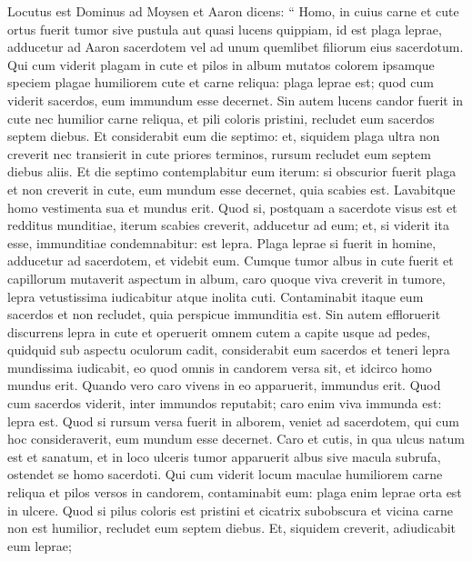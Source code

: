 \begin{biblechapter}
\begin{biblechapter}
\begin{biblechapter}
\begin{biblechapter}
\begin{biblechapter}
\begin{biblechapter}
\begin{biblechapter}
\begin{biblechapter}
\begin{biblechapter}
\begin{biblechapter}
\begin{biblechapter}
\begin{biblechapter}
\begin{biblechapter}
\verse Locutus est Dominus ad Moysen et Aaron dicens: 
\verse “ Homo, in cuius carne et cute ortus fuerit tumor sive pustula aut quasi lucens quippiam, id est plaga leprae, adducetur ad Aaron sacerdotem vel ad unum quemlibet filiorum eius sacerdotum. 
\verse Qui cum viderit plagam in cute et pilos in album mutatos colorem ipsamque speciem plagae humiliorem cute et carne reliqua: plaga leprae est; quod cum viderit sacerdos, eum immundum esse decernet. 
\verse Sin autem lucens candor fuerit in cute nec humilior carne reliqua, et pili coloris pristini, recludet eum sacerdos septem diebus. 
\verse Et considerabit eum die septimo: et, siquidem plaga ultra non creverit nec transierit in cute priores terminos, rursum recludet eum septem diebus aliis. 
\verse Et die septimo contemplabitur eum iterum: si obscurior fuerit plaga et non creverit in cute, eum mundum esse decernet, quia scabies est. Lavabitque homo vestimenta sua et mundus erit. 
\verse Quod si, postquam a sacerdote visus est et redditus munditiae, iterum scabies creverit, adducetur ad eum; 
\verse et, si viderit ita esse, immunditiae condemnabitur: est lepra.
 \verse Plaga leprae si fuerit in homine, adducetur ad sacerdotem, 
\verse et videbit eum. Cumque tumor albus in cute fuerit et capillorum mutaverit aspectum in album, caro quoque viva creverit in tumore, 
\verse lepra vetustissima iudicabitur atque inolita cuti. Contaminabit itaque eum sacerdos et non recludet, quia perspicue immunditia est. 
\verse Sin autem effloruerit discurrens lepra in cute et operuerit omnem cutem a capite usque ad pedes, quidquid sub aspectu oculorum cadit, 
\verse considerabit eum sacerdos et teneri lepra mundissima iudicabit, eo quod omnis in candorem versa sit, et idcirco homo mundus erit. 
\verse Quando vero caro vivens in eo apparuerit, immundus erit. 
 \verse Quod cum sacerdos viderit, inter immundos reputabit; caro enim viva immunda est: lepra est. 
\verse Quod si rursum versa fuerit in alborem, veniet ad sacerdotem, 
\verse qui cum hoc consideraverit, eum mundum esse decernet.
 \verse Caro et cutis, in qua ulcus natum est et sanatum, 
\verse et in loco ulceris tumor apparuerit albus sive macula subrufa, ostendet se homo sacerdoti. 
\verse Qui cum viderit locum maculae humiliorem carne reliqua et pilos versos in candorem, contaminabit eum: plaga enim leprae orta est in ulcere. 
\verse Quod si pilus coloris est pristini et cicatrix subobscura et vicina carne non est humilior, recludet eum septem diebus. 
\verse Et, siquidem creverit, adiudicabit eum leprae; 

\end{biblechapter}
\end{biblechapter}
\end{biblechapter}
\end{biblechapter}
\end{biblechapter}
\end{biblechapter}
\end{biblechapter}
\end{biblechapter}
\end{biblechapter}
\end{biblechapter}
\end{biblechapter}
\end{biblechapter}
\end{biblechapter}
